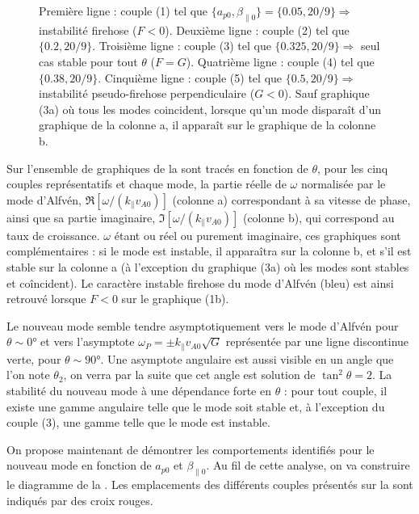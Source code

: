 \begin{figure}[!ht]
{ Première ligne : couple (1) tel que \ensuremath{\{a_{p0},\beta_{\parallel 0}\} = \{0.05,  20/9\} \Rightarrow} instabilité firehose (\ensuremath{F<0}).
Deuxième ligne : couple (2) tel que \ensuremath{\{0.2, 20/9\}}.
Troisième ligne : couple (3) tel que \ensuremath{\{0.325, 20/9\} \Rightarrow} seul cas stable pour tout \ensuremath{\theta} (\ensuremath{F=G}).
 Quatrième ligne : couple (4) tel que \ensuremath{\{0.38, 20/9 \} }.
Cinquième ligne : couple (5) tel que \ensuremath{\{0.5, 20/9\}  \Rightarrow} instabilité pseudo-firehose perpendiculaire (\ensuremath{G<0}).
     Sauf graphique (3a) où tous les modes coincident, lorsque qu'un mode disparaît d'un graphique de la colonne a, il apparaît sur le graphique de la colonne b.}
\label{fig:lin_omega_theta}
\end{figure}
Sur l'ensemble de graphiques de la  sont tracés en fonction de $\theta$, pour les cinq couples représentatifs et chaque mode, la partie réelle de $\omega$ normalisée par le mode d'Alfvén, $\Re[\omega/(k_{\parallel}v_{A0})]$ (colonne a) correspondant à sa vitesse de phase, ainsi que sa partie imaginaire, $\Im[\omega/(k_{\parallel}v_{A0})]$ (colonne b), qui correspond au taux de croissance. $\omega$ étant ou réel ou purement imaginaire, ces graphiques sont complémentaires : si le mode est instable, il apparaîtra sur la colonne b, et s'il est stable sur la colonne a (à l'exception du graphique (3a) où les modes sont stables et coîncident). Le caractère instable firehose du mode d'Alfvén (bleu) est ainsi retrouvé lorsque $F<0$ sur le graphique (1b). 

Le nouveau mode semble tendre asymptotiquement vers le mode d'Alfvén pour $\theta \sim \ang{0}$ et vers l'asymptote $\omega_P = \pm k_{\parallel}v_{A0} \sqrt{G}$ représentée par une ligne discontinue verte, pour $\theta \sim \ang{90}$. Une asymptote angulaire est aussi visible en un angle que l'on note $\theta_2$, on verra par la suite que cet angle est solution de $\tan^2 \theta = 2$. La stabilité du nouveau mode à une dépendance forte en $\theta$ : pour tout couple, il existe une gamme angulaire telle que le mode soit stable et, à l'exception du couple (3), une gamme telle que le mode est instable. 

On propose maintenant de démontrer les comportements identifiés pour le nouveau mode en fonction de $a_{p0}$ et $\beta_{\parallel 0}$. Au fil de cette analyse, on va construire le diagramme de la . Les emplacements des différents couples présentés sur la  sont indiqués par des croix rouges. 

